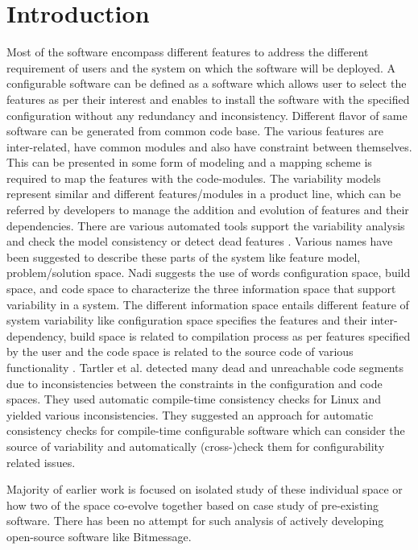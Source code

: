 \documentclass{acm_proc_article-sp}
\begin{document}
\section{Introduction}
Most of the software encompass different features to address the different requirement of users and the system on which the software will be deployed. A configurable software can be defined as a software which allows user to select the features as per their interest and enables to install the software with the specified configuration without any redundancy and inconsistency. Different flavor of same software can be generated  from common code base. The various features are inter-related, have common modules and also have constraint between themselves. This can be presented in some form of modeling and a mapping scheme is required to map the features with the code-modules. The variability models represent similar and different features/modules in a product line, which can be referred by developers to manage the addition and evolution of features and their dependencies. There are various automated tools support the variability analysis and check the model consistency or detect dead features \cite{Berger} \cite{Benavides}. Various names have been suggested to describe these parts of the system like feature model, problem/solution space. Nadi \cite{Nadi}  suggests the use of words configuration space, build space, and code space to characterize the three information space that support variability in a system. The different information space entails different feature of system variability like configuration space specifies the features and their inter-dependency, build space is related to compilation process as per features specified by the user and the code space is related to the source code of various functionality \cite{Nadi}.
Tartler et al. \cite{Tartler} detected many dead and unreachable code segments due to inconsistencies between the constraints in the configuration and code spaces. They used automatic compile-time consistency checks for Linux and yielded various inconsistencies. They suggested an approach for automatic consistency checks for compile-time configurable software which can consider the source of variability and automatically (cross-)check them for configurability related issues.

Majority of earlier work is focused on isolated study of these individual space or how two of the space co-evolve together based on case study of pre-existing software. There has been no attempt for such analysis of actively developing open-source software like Bitmessage.
\end{document}

